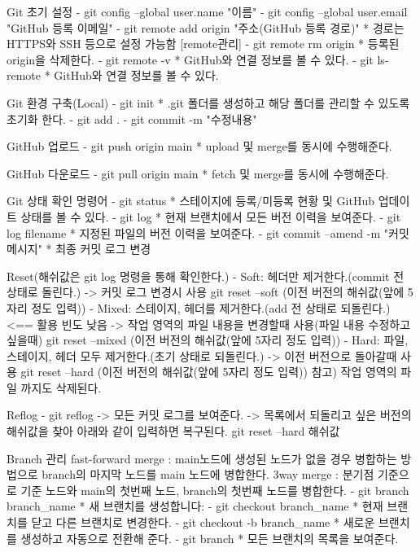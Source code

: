 
Git 초기 설정
  - git config --global user.name "이름"
  - git config --global user.email "GitHub 등록 이메일"
  - git remote add origin "주소(GitHub 등록 경로)"
    * 경로는 HTTPS와 SSH 등으로 설정 가능함
    [remote관리]
    - git remote rm origin
      * 등록된 origin을 삭제한다.
    - git remote -v 
      * GitHub와 연결 정보를 볼 수 있다.
    - git ls-remote
      * GitHub와 연결 정보를 볼 수 있다.

Git 환경 구축(Local)
  - git init 
    * .git 폴더를 생성하고 해당 폴더를 관리할 수 있도록 초기화 한다.
  - git add .
  - git commit -m "수정내용"

GitHub 업로드
  - git push origin main
    * upload 및 merge를 동시에 수행해준다.

GitHub 다운로드
  - git pull origin main
    * fetch 및 merge를 동시에 수행해준다.

Git 상태 확인 명령어
  - git status
    * 스테이지에 등록/미등록 현황 및 GitHub 업데이트 상태를 볼 수 있다.
  - git log
    * 현재 브랜치에서 모든 버전 이력을 보여준다.
  - git log filename
    * 지정된 파일의 버전 이력을 보여준다.
  - git commit --amend -m "커밋 메시지"
    * 최종 커밋 로그 변경

Reset(해쉬값은 git log 명령을 통해 확인한다.)
  - Soft: 헤더만 제거한다.(commit 전 상태로 돌린다.)
    -> 커밋 로그 변경시 사용
    git reset --soft (이전 버전의 해쉬값(앞에 5자리 정도 입력))
  - Mixed: 스테이지, 헤더를 제거한다.(add 전 상태로 되돌린다.)   <== 활용 빈도 낮음
    -> 작업 영역의 파일 내용을 변경할때 사용(파일 내용 수정하고 싶을때)
    git reset --mixed (이전 버전의 해쉬값(앞에 5자리 정도 입력))
  - Hard: 파일, 스테이지, 헤더 모두 제거한다.(초기 상태로 되돌린다.)
    -> 이전 버전으로 돌아갈때 사용
    git reset --hard (이전 버전의 해쉬값(앞에 5자리 정도 입력))
    참고) 작업 영역의 파일 까지도 삭제된다.

Reflog
  - git reflog
    -> 모든 커밋 로그를 보여준다.
    -> 목록에서 되돌리고 싶은 버전의 해쉬값을 찾아 아래와 같이 입력하면 복구된다.
       git reset --hard 해쉬값

Branch 관리
fast-forward merge : main노드에 생성된 노드가 없을 경우 병합하는 방법으로 branch의 마지막 노드를 main 노드에 병합한다.
3way merge : 분기점 기준으로 기준 노드와 main의 첫번째 노드, branch의 첫번째 노드를 병합한다.
  - git branch branch_name
    * 새 브랜치를 생성합니다:
  - git checkout branch_name
    * 현재 브랜치를 닫고 다른 브랜치로 변경한다.
  - git checkout -b branch_name
    * 새로운 브랜치를 생성하고 자동으로 전환해 준다.
  - git branch
    * 모든 브랜치의 목록을 보여준다.

